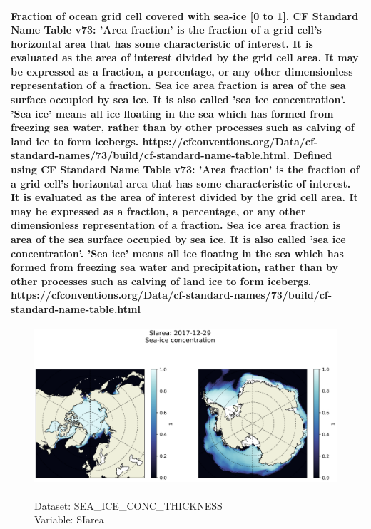 \begin{longtable}{|p{}|p{}|p{}|p{}|}
\multicolumn{4}{|p{1\textwidth}|}{Fraction of ocean grid cell covered with sea-ice [0 to 1]. CF Standard Name Table v73:  'Area fraction' is the fraction of a grid cell's horizontal area that has some characteristic of interest. It is evaluated as the area of interest divided by the grid cell area. It may be expressed as a fraction, a percentage, or any other dimensionless representation of a fraction. Sea ice area fraction is area of the sea surface occupied by sea ice. It is also called 'sea ice concentration'. 'Sea ice' means all ice floating in the sea which has formed from freezing sea water, rather than by other processes such as calving of land ice to form icebergs. https://cfconventions.org/Data/cf-standard-names/73/build/cf-standard-name-table.html. Defined using CF Standard Name Table v73: 'Area fraction' is the fraction of a grid cell's horizontal area that has some characteristic of interest. It is evaluated as the area of interest divided by the grid cell area. It may be expressed as a fraction, a percentage, or any other dimensionless representation of a fraction. Sea ice area fraction is area of the sea surface occupied by sea ice. It is also called 'sea ice concentration'. 'Sea ice' means all ice floating in the sea which has formed from freezing sea water and precipitation, rather than by other processes such as calving of land ice to form icebergs. https://cfconventions.org/Data/cf-standard-names/73/build/cf-standard-name-table.html} \\ \hline
\end{longtable}

\begin{figure}[H]
\centering
\includegraphics[scale=0.5]{../images/plots/latlon_plots/Sea-Ice_and_Snow_Concentration_and_Thickness/SIarea.png}
\caption{\\Dataset: SEA\_ICE\_CONC\_THICKNESS\\Variable: SIarea}
\label{tab:table-SEA_ICE_CONC_THICKNESS_SIarea-Plot}
\end{figure}
\pagebreak
